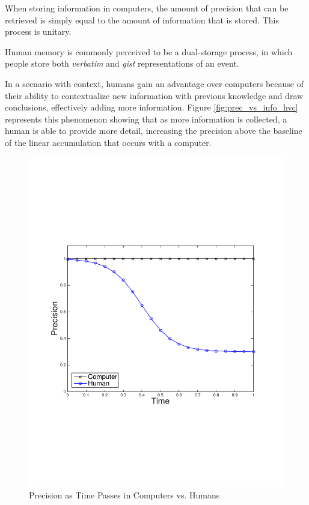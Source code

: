When storing information in computers, the amount of precision that can be retrieved is simply equal to the amount of information that is stored.  This process is unitary.  

Human memory is commonly perceived to be a dual-storage process, in which people store both \emph{verbatim} and \emph{gist} representations of an event.  

In a scenario with context, humans gain an advantage over computers because of their ability to contextualize new information with previous knowledge and draw conclusions, effectively adding more information.  Figure \ref{fig:prec_vs_info_hvc} represents this phenomenon showing that as more information is collected, a human is able to provide more detail, increasing the precision above the baseline of the linear accumulation that occurs with a computer.  
 


\begin{figure}
\begin{centering}
    \includegraphics[clip=true, trim = 15mm 65mm 25mm 70mm, scale=0.40]{figures/example_qoi_trends/prec_vs_time_hvc_1.pdf}
    \caption{Precision as Time Passes in Computers vs. Humans }
    \label{fig:prec_vs_time_hvc}
\end{centering}
\end{figure}


